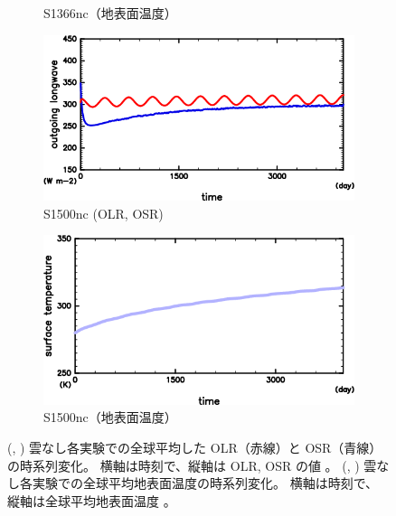 \documentclass[body]{subfiles}
\begin{document}
\begin{figure}[t]
\begin{subfigure}{.4\textwidth}
		\caption{S1366nc（地表面温度）}\label{S1366nc_SurfTemp}
	\end{subfigure}
	\begin{subfigure}{.4\textwidth}
		\centering
		\includegraphics[width=\textwidth]{S1500-nc/S1500nc_OLRA-OSRA_horimean_time0.0-4015.0-crop.png}
		\caption{S1500nc (OLR, OSR)}\label{S1500nc_OLRA}
	\end{subfigure}
	\begin{subfigure}{.4\textwidth}
		\centering
		\includegraphics[width=\textwidth]{S1500-nc/S1500nc_SurfTemp_horimean_time0.0-4015.0-crop.png}
		\caption{S1500nc（地表面温度）}\label{S1500nc_SurfTemp}
	\end{subfigure}
	\caption[雲なし各実験での全球平均 OLR, OSR, 地表面温度の時系列変化]{
		(, )
		雲なし各実験での全球平均した OLR（赤線）と OSR（青線）の時系列変化。
		横軸は時刻で、縦軸は OLR, OSR の値 \hmu*{[W/m^{2}]}。
		(, )
		雲なし各実験での全球平均地表面温度の時系列変化。
		横軸は時刻で、縦軸は全球平均地表面温度 \hmu*{[K]}。
	}\label{timenc}
\end{figure}
\end{document}
